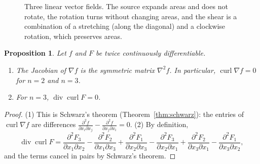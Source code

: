 \documentclass[11pt]{article}
\theoremstyle{definition}
\theoremstyle{plain}
\newtheorem{proposition}[definition]{Proposition}
\theoremstyle{remark}
\DeclareMathOperator{\Div}{div}
\DeclareMathOperator{\curl}{curl}
\begin{document}
\begin{figure}[ht]
    \centering
    \newcommand{\fieldpanel}[4]{%
        \begin{scope}[shift={(#1,0)}]
            \draw[gray!60] (-1.3,0) -- (1.3,0) (0,-1.3) -- (0,1.3);
            \foreach \x in {-1,-0.5,...,1}
                \foreach \y in {-1,-0.5,...,1} {
                    \pgfmathsetmacro{\u}{0.3*(#2)}
                    \pgfmathsetmacro{\v}{0.3*(#3)}
                    \pgfmathsetmacro{\len}{abs(\u) + abs(\v)}
                    \ifdim \len pt > 0.001pt
                        \draw[->, thick, blue!70!black] (\x,\y) -- ++(\u,\v);
                    \else
                        \fill[blue!70!black] (\x,\y) circle (0.9pt);
                    \fi
                }
            \node[below, align=center, font=\small] at (0,-1.4) {#4};
        \end{scope}}
    \caption{Three linear vector fields. The source expands areas and does not rotate, the rotation turns without changing areas, and the shear is a combination of a stretching (along the diagonal) and a clockwise rotation, which preserves areas.}
    \label{fig:vector-fields}
\end{figure}

\begin{proposition}\label{prop:curl-grad}
    Let $f$ and $F$ be twice continuously differentiable.
    \begin{enumerate}
        \item The Jacobian of $\nabla f$ is the symmetric matrix $\nabla^2 f$. In particular, $\curl\nabla f = 0$ for $n = 2$ and $n = 3$.
        \item For $n = 3$, $\Div\curl F = 0$.
    \end{enumerate}
\end{proposition}

\begin{proof}
    (1) This is Schwarz's theorem (Theorem~\ref{thm:schwarz}): the entries of $\curl\nabla f$ are differences $\frac{\partial^2 f}{\partial x_i\partial x_j} - \frac{\partial^2 f}{\partial x_j\partial x_i} = 0$. (2) By definition,
    \[\Div\curl F = \frac{\partial^2 F_3}{\partial x_1\partial x_2} - \frac{\partial^2 F_2}{\partial x_1\partial x_3} + \frac{\partial^2 F_1}{\partial x_2\partial x_3} - \frac{\partial^2 F_3}{\partial x_2\partial x_1} + \frac{\partial^2 F_2}{\partial x_3\partial x_1} - \frac{\partial^2 F_1}{\partial x_3\partial x_2},\]
    and the terms cancel in pairs by Schwarz's theorem.
\end{proof}
\end{document}
